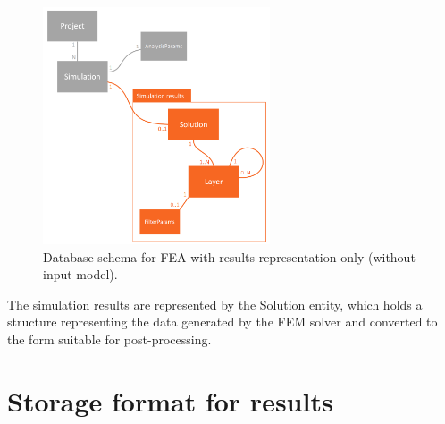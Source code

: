 \begin{figure}[H]
    \centering
    \includegraphics[width=0.6\textwidth]{figures/FEA-database-schema-only-results}
    \decoRule
    \caption{Database schema for FEA with results representation only (without input model).}
    \label{fig:FEA-db-schema-results}
\end{figure}

The simulation results are represented by the Solution entity, which holds a structure representing the data generated by the FEM solver and converted to the form suitable for post-processing.







\section{Storage format for results}
\label{sec:storage-format}


